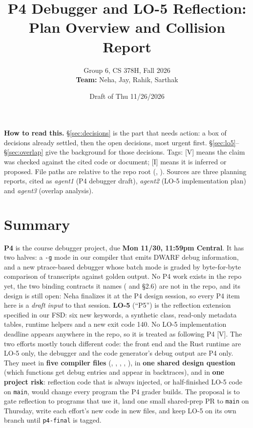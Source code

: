 \documentclass[10pt]{article}
\title{\vspace{-1.2em}\textbf{P4 Debugger and LO-5 Reflection: Plan Overview and Collision Report}\vspace{-0.4em}}
\author{Group 6, CS 378H, Fall 2026\\[0.2em]
  \textbf{Team:} Neha, Jay, Rahik, Sarthak}
\date{Draft of Thu 11/26/2026}
\newcommand{\code}[1]{\texttt{\small #1}}
\newcommand{\mV}{\textsf{\scriptsize[V]}}
\newcommand{\mI}{\textsf{\scriptsize[I]}}
\begin{document}
\maketitle

\textbf{How to read this.} \S\ref{sec:decisions} is the part that needs action: a box of decisions already settled, then the open decisions, most urgent first. \S\ref{sec:lo5}--\S\ref{sec:overlap} give the background for those decisions. Tags: \mV{} means the claim was checked against the cited code or document; \mI{} means it is inferred or proposed. File paths are relative to the repo root (, ). Sources are three planning reports, cited as \emph{agent1} (P4 debugger draft), \emph{agent2} (LO-5 implementation plan) and \emph{agent3} (overlap analysis).

\section{Summary}\label{sec:summary}
\textbf{P4} is the course debugger project, due \textbf{Mon 11/30, 11:59pm Central}. It has two halves: a \code{-g} mode in our compiler that emits DWARF debug information, and a new ptrace-based debugger whose batch mode is graded by byte-for-byte comparison of transcripts against golden output. No P4 work exists in the repo yet, the two binding contracts it names ( and  §2.6) are not in the repo, and its design is still open: Neha finalizes it at the P4 design session, so every P4 item here is a \emph{draft input} to that session. \textbf{LO-5} (``P5'') is the reflection extension specified in our FSD: six new keywords, a synthetic  class, read-only metadata tables,  runtime helpers and a new exit code 140. No LO-5 implementation deadline appears anywhere in the repo, so it is treated as following P4 \mV. The two efforts mostly touch different code: the front end and the Rust runtime are LO-5 only, the debugger and the code generator's debug output are P4 only. They meet in \textbf{five compiler files} (, , , , ), in \textbf{one shared design question} (which functions get debug entries and appear in backtraces), and in \textbf{one project risk}: reflection code that is always injected, or half-finished LO-5 code on \code{main}, would change every program the P4 grader builds. The proposal is to gate reflection to programs that use it, land one small shared-prep PR to \code{main} on Thursday, write each effort's new code in new files, and keep LO-5 on its own branch until \code{p4-final} is tagged.
\end{document}

